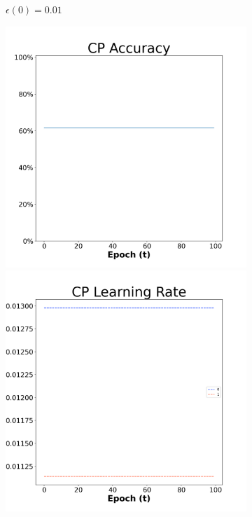 \begin{figure}[H]
\begin{subfigure}{0.3\textwidth}
  \caption{$\epsilon(0)=0.01$}
\end{subfigure}\hfil %
\begin{subfigure}{0.3\textwidth}
  \includegraphics[width=\linewidth]{images/exper1/SP/CP_0.03_acc.png}
  \includegraphics[width=\linewidth]{images/exper1/SP/CP_0.03_lr.png}

\end{subfigure}
\end{figure}
